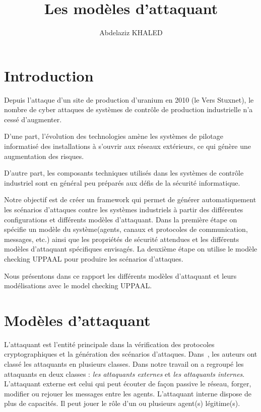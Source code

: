 \documentclass[10pt,a4paper]{article}
\author{Abdelaziz KHALED}
\title{Les modèles d'attaquant}
\begin{document}
\let\cleardoublepage\clearpage
\maketitle
\newpage
\tableofcontents
\newpage
\section{Introduction}
Depuis l’attaque d’un site de production d’uranium en 2010 (le Vers Stuxnet), le nombre
de cyber attaques de systèmes de contrôle de production industrielle n’a cessé d’augmenter.\newline
 
D'une part, l'évolution des technologies amène les systèmes de pilotage informatisé des installations à s'ouvrir aux réseaux extérieurs, ce qui génère une augmentation des risques.\newline

D’autre part, les composants techniques utilisés dans les systèmes de contrôle industriel sont en général peu préparés aux défis de la sécurité informatique.
\newline

Notre objectif est de créer un framework qui permet de générer automatiquement les scénarios d'attaques contre les systèmes industriels à partir des différentes configurations et différents modèles d'attaquant. Dans la première étape on spécifie un modèle du système(agents, canaux et protocoles de communication, messages, etc.) ainsi que les propriétés de sécurité attendues et les différents modèles d'attaquant spécifiques envisagés. La deuxième étape on utilise le modèle checking UPPAAL pour produire les scénarios d'attaques.\newline
  
Nous présentons dans ce rapport les différents modèles d'attaquant et leurs modélisations avec le model checking UPPAAL.  
\section{Modèles d'attaquant}
L'attaquant est l'entité principale dans la vérification des protocoles cryptographiques et la génération des scénarios d'attaques. Dans~\cite{ref1}, les auteurs ont classé les attaquants en plusieurs classes. Dans notre travail on a regroupé les attaquants en deux classes : \textit{les attaquants externes} et \textit{les attaquants internes}. L'attaquant externe est celui qui peut écouter de façon passive le réseau, forger, modifier ou rejouer les messages entre les agents. L'attaquant interne dispose de plus de capacités. Il peut jouer le rôle d'un ou plusieurs agent(s) légitime(s).\newline
\end{document}
